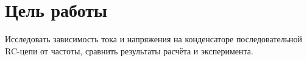 \section{Цель работы}
Исследовать зависимость тока и напряжения на конденсаторе последовательной RC-цепи от
частоты, сравнить результаты расчёта и эксперимента.
